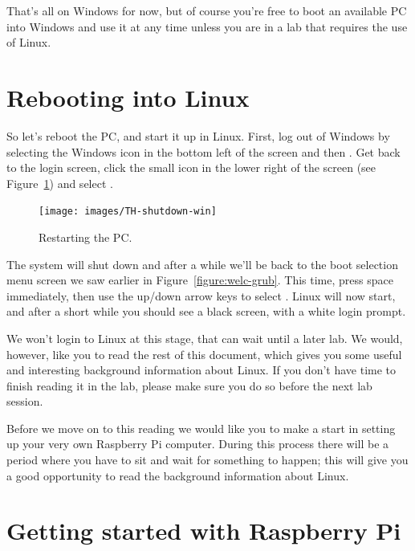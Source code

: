 That's all on Windows for now, but of course  you're free to boot an available PC into Windows  and use it at any time unless you are in a lab that requires the use of Linux.

\section{Rebooting into Linux}
\label{sec:rebooting-into-linux}

So let's reboot the PC, and start it up in Linux. First, log out of
Windows by selecting the Windows icon in the bottom left of the screen and then . Get back to the login screen, click the
small icon in the lower right of the screen (see Figure~\ref{figure:welc-restart}) and select .

\begin{figure}
\centerline{\texttt{[image: images/TH-shutdown-win]}}
\caption{Restarting the PC.}
\label{figure:welc-restart}
\end{figure}

The system will shut down and after a while we'll be back to the boot selection menu
screen we saw earlier in Figure~\ref{figure:welc-grub}. This time, press space immediately, then use
the up/down arrow keys to select . Linux will now start, and after a short while you should
see a black screen, with a white login prompt.

\pgtcommand{\endinput}
We won't login to Linux
at this stage, that can wait until a later lab. We would,
however, like you to read the rest of this document, which gives you
some useful and interesting background information about Linux. If you
don't have time to finish reading it in the lab, please make sure you
do so before the next lab session.

Before we move on to this reading we would like you to make a start in setting up your very own Raspberry Pi computer. During this process there will be a period where you have to sit and wait for something to happen; this will give you a good opportunity to read the background information about Linux.

\section{Getting started with Raspberry Pi}

